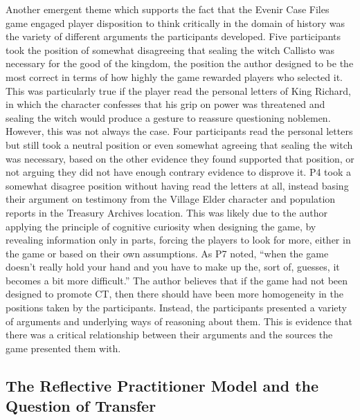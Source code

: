 \documentclass{l4proj}
\begin{document}
Another emergent theme which supports the fact that the Evenir Case Files game engaged player disposition to think critically in the domain of history was the variety of different arguments the participants developed. Five participants took the position of somewhat disagreeing that sealing the witch Callisto was necessary for the good of the kingdom, the position the author designed to be the most correct in terms of how highly the game rewarded players who selected it. This was particularly true if the player read the personal letters of King Richard, in which the character confesses that his grip on power was threatened and sealing the witch would produce a gesture to reassure questioning noblemen. However, this was not always the case. Four participants read the personal letters but still took a neutral position or even somewhat agreeing that sealing the witch was necessary, based on the other evidence they found supported that position, or not arguing they did not have enough contrary evidence to disprove it. P4 took a somewhat disagree position without having read the letters at all, instead basing their argument on testimony from the Village Elder character and population reports in the Treasury Archives location. This was likely due to the author applying the principle of cognitive curiosity \citep{malone1980makes} when designing the game, by revealing information only in parts, forcing the players to look for more, either in the game or based on their own assumptions. As P7 noted, “when the game doesn't really hold your hand and you have to make up the, sort of, guesses, it becomes a bit more difficult.” The author believes that if the game had not been designed to promote CT, then there should have been more homogeneity in the positions taken by the participants. Instead, the participants presented a variety of arguments and underlying ways of reasoning about them. This is evidence that there was a critical relationship between their arguments and the sources the game presented them with.

\subsection{The Reflective Practitioner Model and the Question of Transfer}
\end{document}

